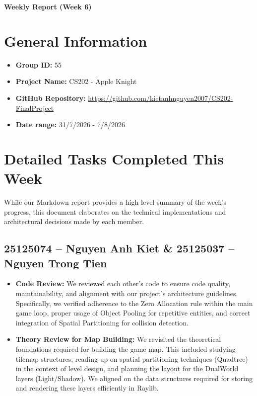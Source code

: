 \documentclass[12pt,a4paper]{article}
\begin{document}
\begin{center}
    \LARGE \textbf{Weekly Report (Week 6)} \\
    \vspace{0.5cm}
\end{center}

\section*{General Information}
\begin{itemize}
    \item \textbf{Group ID:} 55
    \item \textbf{Project Name:} CS202 - Apple Knight
    \item \textbf{GitHub Repository:} \url{https://github.com/kietanhnguyen2007/CS202-FinalProject}
    \item \textbf{Date range:} 31/7/2026 - 7/8/2026
\end{itemize}

\section*{Detailed Tasks Completed This Week}
While our Markdown report provides a high-level summary of the week's progress, this document elaborates on the technical implementations and architectural decisions made by each member.

\subsection*{25125074 -- Nguyen Anh Kiet \& 25125037 -- Nguyen Trong Tien}
\begin{itemize}
    \item \textbf{Code Review:} We reviewed each other's code to ensure code quality, maintainability, and alignment with our project's architecture guidelines. Specifically, we verified adherence to the Zero Allocation rule within the main game loop, proper usage of Object Pooling for repetitive entities, and correct integration of Spatial Partitioning for collision detection.
    
    \item \textbf{Theory Review for Map Building:} We revisited the theoretical foundations required for building the game map. This included studying tilemap structures, reading up on spatial partitioning techniques (Quadtree) in the context of level design, and planning the layout for the DualWorld layers (Light/Shadow). We aligned on the data structures required for storing and rendering these layers efficiently in Raylib.
\end{itemize}
\end{document}
